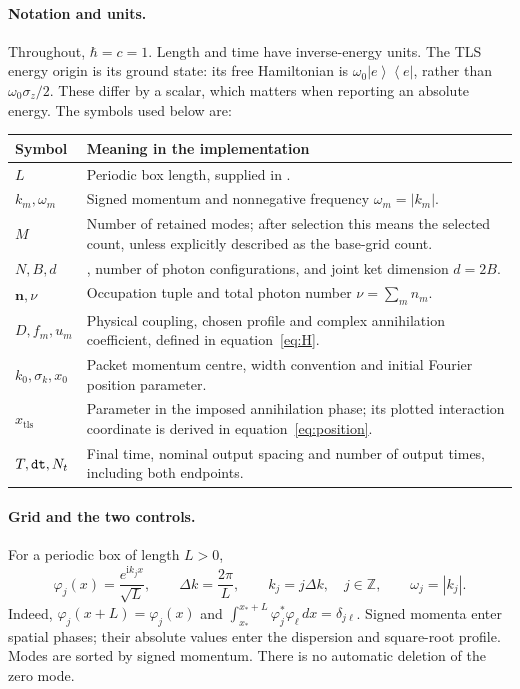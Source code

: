 \documentclass[11pt,a4paper]{article}
\newcommand{\ket}[1]{\left|#1\right\rangle}
\newcommand{\bra}[1]{\left\langle#1\right|}
\newcommand{\ii}{\mathrm{i}}
\newcommand{\code}[1]{\texttt{\detokenize{#1}}}
\begin{document}
\paragraph{Notation and units.}
Throughout, $\hbar=c=1$. Length and time have inverse-energy units.
The TLS energy origin is its ground state: its free Hamiltonian is
$\omega_0\ket e\bra e$, rather than $\omega_0\sigma_z/2$.
These differ by a scalar, which matters when reporting an absolute energy.
The symbols used below are:
\begin{longtable}{p{}p{}}
\toprule Symbol & Meaning in the implementation\\\midrule\endhead
$L$ & Periodic box length, supplied in \code{param_atom}.\\
$k_m,\omega_m$ & Signed momentum and nonnegative frequency $\omega_m=|k_m|$.\\
$M$ & Number of retained modes; after selection this means the selected
count, unless explicitly described as the base-grid count.\\
$N,B,d$ & \code{n_max}, number of photon configurations, and joint ket
dimension $d=2B$.\\
$\bm n,\nu$ & Occupation tuple and total photon number $\nu=\sum_m n_m$.\\
$D,f_m,u_m$ & Physical coupling, chosen profile and complex annihilation
coefficient, defined in equation~\eqref{eq:H}.\\
$k_0,\sigma_k,x_0$ & Packet momentum centre, width convention and initial
Fourier position parameter.\\
$x_{\mathrm{tls}}$ & Parameter in the imposed annihilation phase;
its plotted interaction coordinate is derived in equation~\eqref{eq:position}.\\
$T,\code{dt},N_t$ & Final time, nominal output spacing and number of
output times, including both endpoints.\\
\bottomrule
\end{longtable}
\paragraph{Grid and the two controls.}
For a periodic box of length $L>0$,
\begin{equation}
 \varphi_j(x)=\frac{e^{\ii k_jx}}{\sqrt L},\qquad
 \Delta k=\frac{2\pi}{L},\qquad k_j=j\Delta k,\quad j\in\mathbb Z,
 \qquad \omega_j=|k_j|.
 \label{eq:grid}
\end{equation}
Indeed, $\varphi_j(x+L)=\varphi_j(x)$ and
$\int_{x_*}^{x_*+L}\varphi_j^*\varphi_\ell\,dx=\delta_{j\ell}$.
Signed momenta enter spatial phases; their absolute values enter the dispersion
and square-root profile. Modes are sorted by signed momentum. There is no
automatic deletion of the zero mode.
\end{document}
